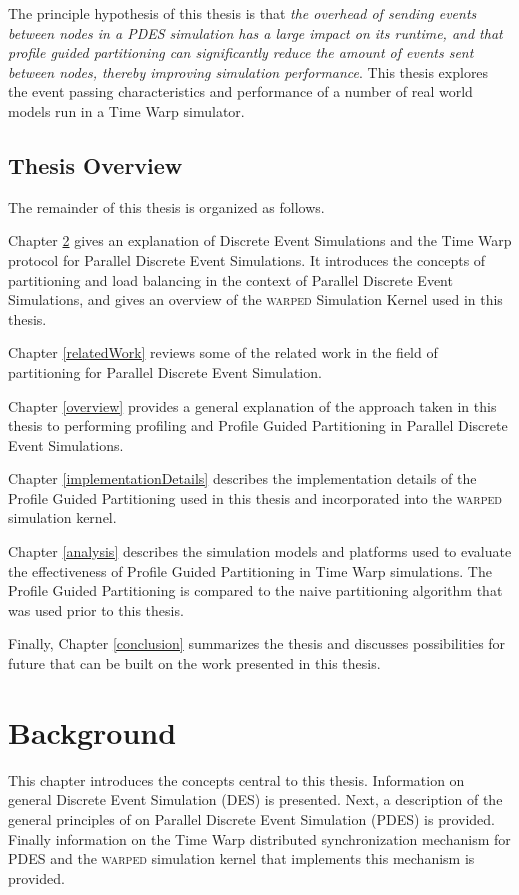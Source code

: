 \documentclass[11pt]{book}
\begin{document}
The principle hypothesis of this thesis is that \emph{the overhead of sending events between nodes in a PDES simulation has a large impact on its runtime, and that profile guided partitioning can significantly reduce the amount of events sent between nodes, thereby improving simulation performance}. This thesis explores the event passing characteristics and performance of a number of real world models run in a Time Warp simulator.

\section{Thesis Overview}

The remainder of this thesis is organized as follows.

Chapter \ref{background} gives an explanation of Discrete Event Simulations and the Time Warp protocol for Parallel Discrete Event Simulations. It introduces the concepts of partitioning and load balancing in the context of Parallel Discrete Event Simulations, and gives an overview of the \textsc{warped} Simulation Kernel used in this thesis.

Chapter \ref{relatedWork} reviews some of the related work in the field of partitioning for Parallel Discrete Event Simulation.

Chapter \ref{overview} provides a general explanation of the approach taken in this thesis to performing profiling and Profile Guided Partitioning in Parallel Discrete Event Simulations.

Chapter \ref{implementationDetails} describes the implementation details of the Profile Guided Partitioning used in this thesis and incorporated into the \textsc{warped} simulation kernel.

Chapter \ref{analysis} describes the simulation models and platforms used to evaluate the effectiveness of Profile Guided Partitioning in Time Warp simulations. The Profile Guided Partitioning is compared to the naive partitioning algorithm that was used prior to this thesis.

Finally, Chapter \ref{conclusion} summarizes the thesis and discusses possibilities for future that can be built on the work presented in this thesis.

\chapter{Background}\label{background}

This chapter introduces the concepts central to this thesis. Information on general Discrete Event Simulation (DES) is presented. Next, a description of the general principles of on Parallel Discrete Event Simulation (PDES) is provided. Finally information on the Time Warp distributed synchronization mechanism for PDES and the \textsc{warped} simulation kernel that implements this mechanism is provided.
\end{document}
